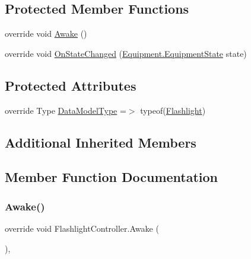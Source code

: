 \subsection*{Protected Member Functions}
\begin{DoxyCompactItemize}
\item 
override void \mbox{\hyperlink{class_flashlight_controller_abc32336593ebdc56f906399f940c542d}{Awake}} ()
\item 
override void \mbox{\hyperlink{class_flashlight_controller_a80535a2da68630caac6deddcce5d388e}{On\+State\+Changed}} (\mbox{\hyperlink{class_equipment_a8b3877398e5be5b420818b99ad7f0bca}{Equipment.\+Equipment\+State}} state)
\end{DoxyCompactItemize}
\subsection*{Protected Attributes}
\begin{DoxyCompactItemize}
\item 
override Type \mbox{\hyperlink{class_flashlight_controller_a30629c2b9854407919c41b09c0c31cc9}{Data\+Model\+Type}} =$>$ typeof(\mbox{\hyperlink{class_flashlight}{Flashlight}})
\end{DoxyCompactItemize}
\subsection*{Additional Inherited Members}


\subsection{Member Function Documentation}
\mbox{\label{class_flashlight_controller_abc32336593ebdc56f906399f940c542d}} 
\subsubsection{\texorpdfstring{Awake()}{Awake()}}
{\footnotesize\ttfamily override void Flashlight\+Controller.\+Awake (\begin{DoxyParamCaption}{ }\end{DoxyParamCaption})\hspace{0.3cm}{\ttfamily [protected]}, {\ttfamily [virtual]}}



